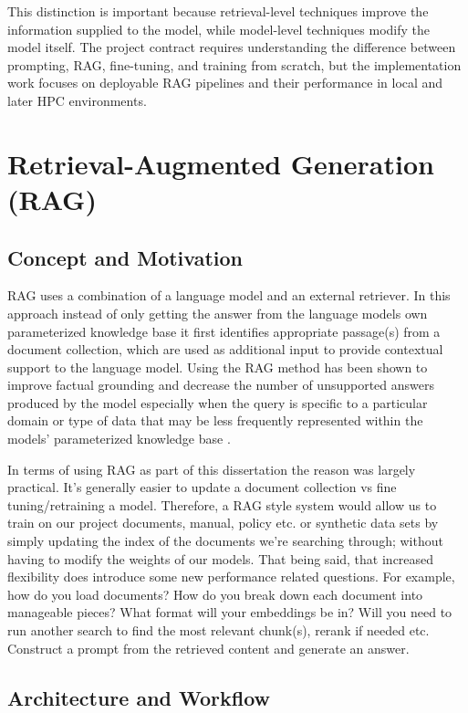This distinction is important because retrieval-level techniques improve the information supplied to the model, while model-level techniques modify the model itself. The project contract requires understanding the difference between prompting, \ac{RAG}, fine-tuning, and training from scratch, but the implementation work focuses on deployable \ac{RAG} pipelines and their performance in local and later \ac{HPC} environments.

\section{Retrieval-Augmented Generation (RAG)}

\subsection{Concept and Motivation}

\ac{RAG} uses a combination of a language model and an external retriever. In this approach instead of only getting the answer from the language models own parameterized knowledge base it first identifies appropriate passage(s) from a document collection, which are used as additional input to provide contextual support to the language model. Using the \ac{RAG} method has been shown to improve factual grounding and decrease the number of unsupported answers produced by the model especially when the query is specific to a particular domain or type of data that may be less frequently represented within the models' parameterized knowledge base \cite{lewis2020rag}.

In terms of using \ac{RAG} as part of this dissertation the reason was largely practical. It's generally easier to update a document collection vs fine tuning/retraining a model. Therefore, a \ac{RAG} style system would allow us to train on our project documents, manual, policy etc. or synthetic data sets by simply updating the index of the documents we're searching through; without having to modify the weights of our models. That being said, that increased flexibility does introduce some new performance related questions. For example, how do you load documents? How do you break down each document into manageable pieces? What format will your embeddings be in? Will you need to run another search to find the most relevant chunk(s), rerank if needed etc. Construct a prompt from the retrieved content and generate an answer.

\subsection{Architecture and Workflow}

